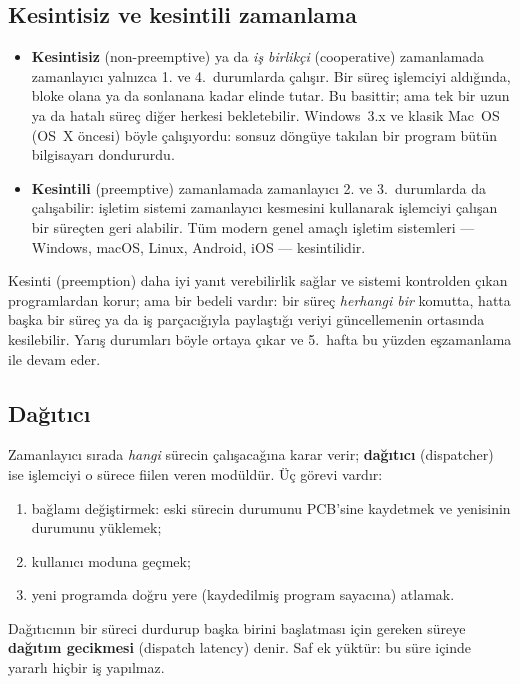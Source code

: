 \documentclass[11pt,a4paper]{article}
\newcommand{\term}[1]{\textbf{\color{mintdeep}#1}}
\begin{document}
\subsection{Kesintisiz ve kesintili zamanlama}

\begin{itemize}
  \item \term{Kesintisiz} (non-preemptive) ya da \emph{iş birlikçi} (cooperative) zamanlamada zamanlayıcı yalnızca 1. ve 4.~durumlarda çalışır. Bir süreç işlemciyi aldığında, bloke olana ya da sonlanana kadar elinde tutar. Bu basittir; ama tek bir uzun ya da hatalı süreç diğer herkesi bekletebilir. Windows~3.x ve klasik Mac~OS (OS~X öncesi) böyle çalışıyordu: sonsuz döngüye takılan bir program bütün bilgisayarı dondururdu.
  \item \term{Kesintili} (preemptive) zamanlamada zamanlayıcı 2. ve 3.~durumlarda da çalışabilir: işletim sistemi zamanlayıcı kesmesini kullanarak işlemciyi çalışan bir süreçten geri alabilir. Tüm modern genel amaçlı işletim sistemleri --- Windows, macOS, Linux, Android, iOS --- kesintilidir.
\end{itemize}

Kesinti (preemption) daha iyi yanıt verebilirlik sağlar ve sistemi kontrolden çıkan programlardan korur; ama bir bedeli vardır: bir süreç \emph{herhangi bir} komutta, hatta başka bir süreç ya da iş parçacığıyla paylaştığı veriyi güncellemenin ortasında kesilebilir. Yarış durumları böyle ortaya çıkar ve 5.~hafta bu yüzden eşzamanlama ile devam eder.

\subsection{Dağıtıcı}

Zamanlayıcı sırada \emph{hangi} sürecin çalışacağına karar verir; \term{dağıtıcı} (dispatcher) ise işlemciyi o sürece fiilen veren modüldür. Üç görevi vardır:
\begin{enumerate}[leftmargin=1.4em]
  \item bağlamı değiştirmek: eski sürecin durumunu PCB'sine kaydetmek ve yenisinin durumunu yüklemek;
  \item kullanıcı moduna geçmek;
  \item yeni programda doğru yere (kaydedilmiş program sayacına) atlamak.
\end{enumerate}

Dağıtıcının bir süreci durdurup başka birini başlatması için gereken süreye \term{dağıtım gecikmesi} (dispatch latency) denir. Saf ek yüktür: bu süre içinde yararlı hiçbir iş yapılmaz.
\end{document}
